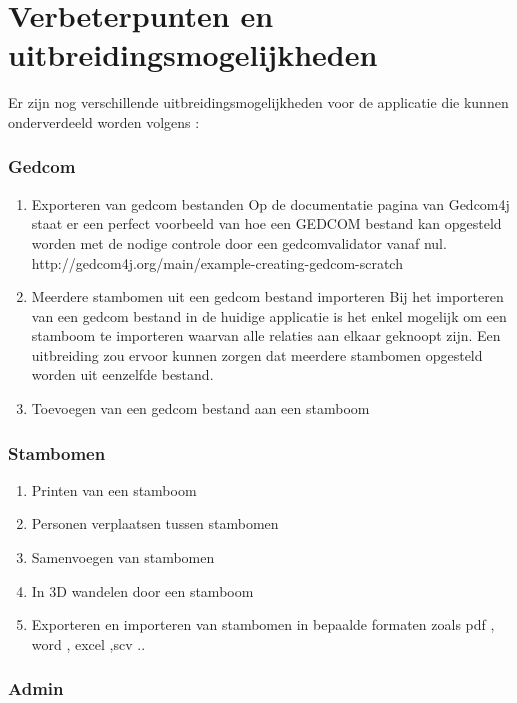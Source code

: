 \documentclass[pdftex,a4paper,12pt,twoside]{report}
\begin{document}
\chapter{Verbeterpunten en uitbreidingsmogelijkheden}

Er zijn nog verschillende uitbreidingsmogelijkheden voor de applicatie die kunnen onderverdeeld worden volgens :
\subsection{Gedcom}
\begin{enumerate}
\item \label{it:first} Exporteren van gedcom bestanden
	Op de documentatie pagina van Gedcom4j staat er een perfect voorbeeld van hoe een GEDCOM bestand kan opgesteld worden met de nodige controle door een gedcomvalidator vanaf nul.
	http://gedcom4j.org/main/example-creating-gedcom-scratch
\item \label{it:first}  Meerdere stambomen uit een gedcom bestand importeren
	Bij het importeren van een gedcom bestand in de huidige applicatie is het enkel mogelijk om een stamboom te importeren waarvan alle relaties aan elkaar geknoopt zijn.
	Een uitbreiding zou ervoor kunnen zorgen dat meerdere stambomen opgesteld worden uit eenzelfde bestand.
\item \label{it:first} Toevoegen van een gedcom bestand aan een stamboom
\end{enumerate}

 
\subsection{Stambomen}
\begin{enumerate}
\item \label{it:first} Printen van een stamboom
\item \label{it:first} Personen verplaatsen tussen stambomen
\item \label{it:first} Samenvoegen van stambomen
\item \label{it:first} In 3D wandelen door een stamboom
\item \label{it:first} Exporteren en importeren van stambomen in bepaalde formaten zoals pdf , word , excel ,scv ..
\end{enumerate}

\subsection{Admin}
\end{document}

